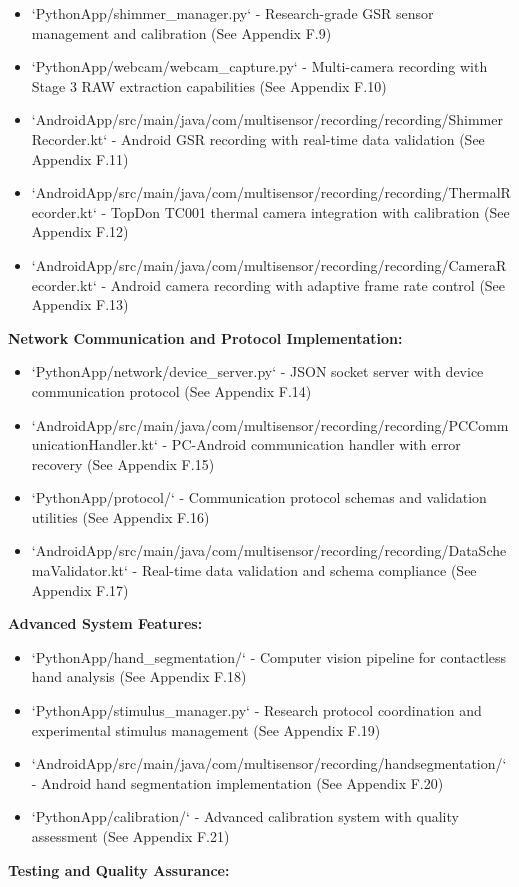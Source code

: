 \documentclass[11pt,a4paper]{article}
\begin{document}
\begin{itemize}
\item `PythonApp/shimmer_manager.py` - Research-grade GSR sensor management and calibration (See Appendix F.9)
\item `PythonApp/webcam/webcam_capture.py` - Multi-camera recording with Stage 3 RAW extraction capabilities (See
  Appendix F.10)
\item `AndroidApp/src/main/java/com/multisensor/recording/recording/ShimmerRecorder.kt` - Android GSR recording with
  real-time data validation (See Appendix F.11)
\item `AndroidApp/src/main/java/com/multisensor/recording/recording/ThermalRecorder.kt` - TopDon TC001 thermal camera
  integration with calibration (See Appendix F.12)
\item `AndroidApp/src/main/java/com/multisensor/recording/recording/CameraRecorder.kt` - Android camera recording with
  adaptive frame rate control (See Appendix F.13)

\end{itemize}
\textbf{Network Communication and Protocol Implementation:}

\begin{itemize}
\item `PythonApp/network/device_server.py` - JSON socket server with device communication protocol (See
  Appendix F.14)
\item `AndroidApp/src/main/java/com/multisensor/recording/recording/PCCommunicationHandler.kt` - PC-Android communication
  handler with error recovery (See Appendix F.15)
\item `PythonApp/protocol/` - Communication protocol schemas and validation utilities (See Appendix F.16)
\item `AndroidApp/src/main/java/com/multisensor/recording/recording/DataSchemaValidator.kt` - Real-time data validation and
  schema compliance (See Appendix F.17)

\end{itemize}
\textbf{Advanced System Features:}

\begin{itemize}
\item `PythonApp/hand_segmentation/` - Computer vision pipeline for contactless hand analysis (See Appendix F.18)
\item `PythonApp/stimulus_manager.py` - Research protocol coordination and experimental stimulus management (See
  Appendix F.19)
\item `AndroidApp/src/main/java/com/multisensor/recording/handsegmentation/` - Android hand segmentation implementation (See
  Appendix F.20)
\item `PythonApp/calibration/` - Advanced calibration system with quality assessment (See Appendix F.21)

\end{itemize}
\textbf{Testing and Quality Assurance:}
\end{document}
